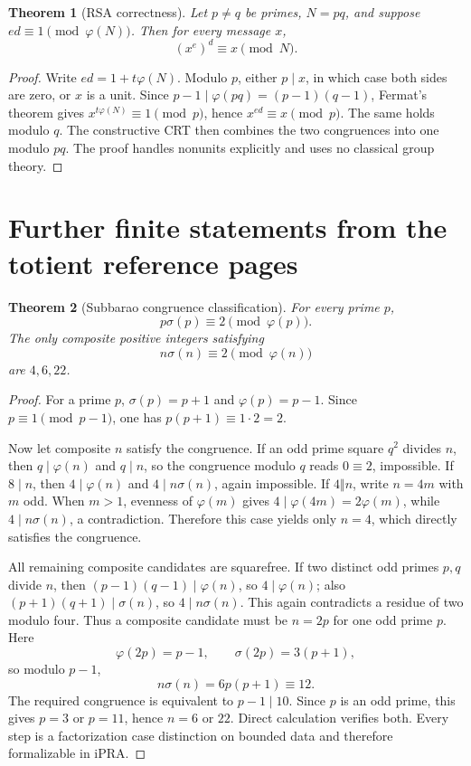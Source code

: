 \documentclass[11pt]{article}
\newtheorem{theorem}{Theorem}[section]
\theoremstyle{definition}
\newcommand{\ipra}{\mathrm{iPRA}}
\begin{document}
\begin{theorem}[RSA correctness]\label{thm:rsa}
Let \(p\ne q\) be primes, \(N=pq\), and suppose
\(ed\equiv1\pmod{\varphi(N)}\).  Then for every message \(x\),
\[
 (x^e)^d\equiv x\pmod N.
\]
\end{theorem}

\begin{proof}
Write \(ed=1+t\varphi(N)\).  Modulo \(p\), either \(p\mid x\), in which case
both sides are zero, or \(x\) is a unit.  Since
\(p-1\mid\varphi(pq)=(p-1)(q-1)\), Fermat's theorem gives
\(x^{t\varphi(N)}\equiv1\pmod p\), hence \(x^{ed}\equiv x\pmod p\).
The same holds modulo \(q\).  The constructive CRT then combines the two
congruences into one modulo \(pq\).  The proof handles nonunits explicitly and
uses no classical group theory.
\end{proof}


\section{Further finite statements from the totient reference pages}

\begin{theorem}[Subbarao congruence classification]\label{thm:subbarao}
For every prime \(p\),
\[
 p\sigma(p)\equiv2\pmod{\varphi(p)}.
\]
The only composite positive integers satisfying
\[
 n\sigma(n)\equiv2\pmod{\varphi(n)}
\]
are \(4,6,22\).
\end{theorem}

\begin{proof}
For a prime \(p\), \(\sigma(p)=p+1\) and \(\varphi(p)=p-1\).  Since
\(p\equiv1\pmod{p-1}\), one has
\(p(p+1)\equiv1\cdot2=2\).

Now let composite \(n\) satisfy the congruence.  If an odd prime square
\(q^2\) divides \(n\), then \(q\mid\varphi(n)\) and \(q\mid n\), so the
congruence modulo \(q\) reads \(0\equiv2\), impossible.  If \(8\mid n\),
then \(4\mid\varphi(n)\) and \(4\mid n\sigma(n)\), again impossible.  If
\(4\Vert n\), write \(n=4m\) with \(m\) odd.  When \(m>1\), evenness of
\(\varphi(m)\) gives \(4\mid\varphi(4m)=2\varphi(m)\), while
\(4\mid n\sigma(n)\), a contradiction.  Therefore this case yields only
\(n=4\), which directly satisfies the congruence.

All remaining composite candidates are squarefree.  If two distinct odd
primes \(p,q\) divide \(n\), then \((p-1)(q-1)\mid\varphi(n)\), so
\(4\mid\varphi(n)\); also \((p+1)(q+1)\mid\sigma(n)\), so
\(4\mid n\sigma(n)\).  This again contradicts a residue of two modulo four.
Thus a composite candidate must be \(n=2p\) for one odd prime \(p\).  Here
\[
 \varphi(2p)=p-1,
 \qquad
 \sigma(2p)=3(p+1),
\]
so modulo \(p-1\),
\[
 n\sigma(n)=6p(p+1)\equiv12.
\]
The required congruence is equivalent to \(p-1\mid10\).  Since \(p\) is an
odd prime, this gives \(p=3\) or \(p=11\), hence \(n=6\) or \(22\).  Direct
calculation verifies both.  Every step is a factorization case distinction
on bounded data and therefore formalizable in \(\ipra\).
\end{proof}
\end{document}
